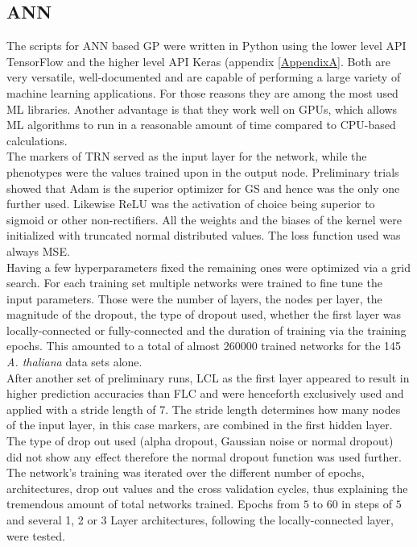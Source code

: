 \subsection{ANN}
The scripts for ANN based GP were written in Python using the lower level API TensorFlow
\cite{TF2016} and the higher level API Keras \cite{keras2015} (appendix
\ref{AppendixA}. Both are very versatile, well-documented and are capable of performing a
large variety of machine learning applications. For those reasons they are among the most
used ML libraries. Another advantage is that they work well on GPUs, which allows ML
algorithms to run in a reasonable amount of time compared to CPU-based calculations. \\
The markers of TRN served as the input layer for the network, while the phenotypes were the
values trained upon in the output node. Preliminary trials showed that Adam is the
superior optimizer for GS and hence was the only one further used. Likewise ReLU was the
activation of choice being superior to sigmoid or other non-rectifiers. All the weights
and the biases of the kernel were initialized with truncated normal distributed
values. The loss function used was always MSE. \\
Having a few hyperparameters fixed the remaining ones were optimized via a grid
search. For each training set multiple networks were trained to fine tune the input
parameters. Those were the number of layers, the nodes per layer, the magnitude of the
dropout, the type of dropout used, whether the first layer was locally-connected or
fully-connected and the duration of training via the training epochs. This amounted to a
total of almost 260000 trained networks for the 145 \textit{A. thaliana} data sets alone. \\
After another set of preliminary runs, LCL as the first layer appeared to result in higher
prediction accuracies than FLC and were henceforth exclusively used and applied with a
stride length of 7. The stride length determines how many nodes of the input layer, in
this case markers, are combined in the first hidden layer. The type of drop out used
(alpha dropout, Gaussian noise or normal dropout) did not show any effect therefore the
normal dropout function was used further. The network's training was iterated over the
different number of epochs, architectures, drop out values and the cross validation
cycles, thus explaining the tremendous amount of total networks trained. Epochs from $5$
to $60$ in steps of $5$ and several 1, 2 or 3 Layer architectures, following the
locally-connected layer, were tested.

